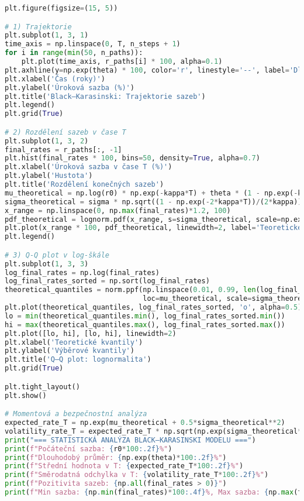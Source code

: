 \begin{example}
\begin{lstlisting}[language=Python, caption={Implementace Black–Karasinski modelu v Pythonu}]
plt.figure(figsize=(15, 5))

# 1) Trajektorie
plt.subplot(1, 3, 1)
time_axis = np.linspace(0, T, n_steps + 1)
for i in range(min(50, n_paths)):
    plt.plot(time_axis, r_paths[i] * 100, alpha=0.1)
plt.axhline(y=np.exp(theta) * 100, color='r', linestyle='--', label='Dlouhodobý průměr')
plt.xlabel('Čas (roky)')
plt.ylabel('Úroková sazba (%)')
plt.title('Black–Karasinski: Trajektorie sazeb')
plt.legend()
plt.grid(True)

# 2) Rozdělení sazeb v čase T
plt.subplot(1, 3, 2)
final_rates = r_paths[:, -1]
plt.hist(final_rates * 100, bins=50, density=True, alpha=0.7)
plt.xlabel('Úroková sazba v čase T (%)')
plt.ylabel('Hustota')
plt.title('Rozdělení konečných sazeb')
mu_theoretical = np.log(r0) * np.exp(-kappa*T) + theta * (1 - np.exp(-kappa*T))
sigma_theoretical = sigma * np.sqrt((1 - np.exp(-2*kappa*T))/(2*kappa))
x_range = np.linspace(0, np.max(final_rates)*1.2, 100)
pdf_theoretical = lognorm.pdf(x_range, s=sigma_theoretical, scale=np.exp(mu_theoretical))
plt.plot(x_range * 100, pdf_theoretical, linewidth=2, label='Teoretické')
plt.legend()

# 3) Q-Q plot v log-škále
plt.subplot(1, 3, 3)
log_final_rates = np.log(final_rates)
log_final_rates_sorted = np.sort(log_final_rates)
theoretical_quantiles = norm.ppf(np.linspace(0.01, 0.99, len(log_final_rates_sorted)),
                                 loc=mu_theoretical, scale=sigma_theoretical)
plt.plot(theoretical_quantiles, log_final_rates_sorted, 'o', alpha=0.5)
lo = min(theoretical_quantiles.min(), log_final_rates_sorted.min())
hi = max(theoretical_quantiles.max(), log_final_rates_sorted.max())
plt.plot([lo, hi], [lo, hi], linewidth=2)
plt.xlabel('Teoretické kvantily')
plt.ylabel('Výběrové kvantily')
plt.title('Q–Q plot: lognormalita')
plt.grid(True)

plt.tight_layout()
plt.show()

# Momentová a bezpečnostní analýza
expected_rate_T = np.exp(mu_theoretical + 0.5*sigma_theoretical**2)
volatility_rate_T = expected_rate_T * np.sqrt(np.exp(sigma_theoretical**2) - 1)
print("=== STATISTICKÁ ANALÝZA BLACK–KARASINSKI MODELU ===")
print(f"Počáteční sazba: {r0*100:.2f}%")
print(f"Dlouhodobý průměr: {np.exp(theta)*100:.2f}%")
print(f"Střední hodnota v T: {expected_rate_T*100:.2f}%")
print(f"Směrodatná odchylka v T: {volatility_rate_T*100:.2f}%")
print(f"Pozitivita sazeb: {np.all(final_rates > 0)}")
print(f"Min sazba: {np.min(final_rates)*100:.4f}%, Max sazba: {np.max(final_rates)*100:.2f}%")
\end{lstlisting}


\end{example}
